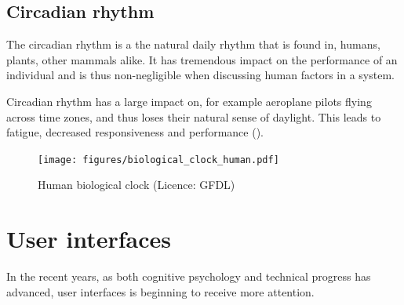 \subsection{Circadian rhythm}
The circadian rhythm is a the natural daily rhythm that is found in, humans, plants, other mammals alike. It has tremendous impact on the performance of an individual and is thus non-negligible when discussing human factors in a system.

Circadian rhythm has a large impact on, for example aeroplane pilots flying across time zones, and thus loses their natural sense of daylight. This leads to fatigue, decreased responsiveness and performance (\cite{mallis2010aircrew}).
\begin{figure}[h]
 \centering
   \texttt{[image: figures/biological\_clock\_human.pdf]}
 \caption{Human biological clock (Licence: GFDL)}
 \label{fig:human_biological_clock}
\end{figure}

\section{User interfaces}
In the recent years, as both cognitive psychology and technical progress has advanced, user interfaces is beginning to receive more attention. 

